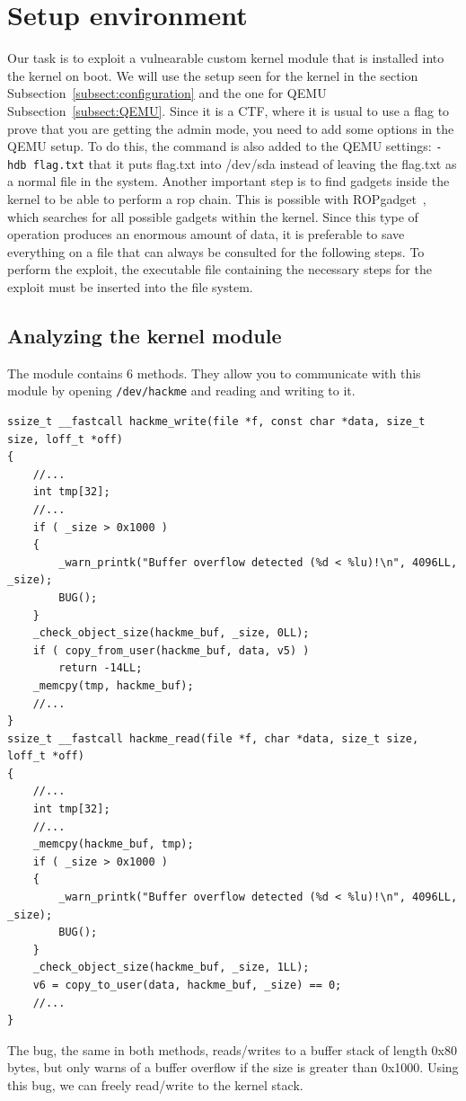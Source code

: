 \documentclass{masterthesis}
\newcommand{\refToSubSection}[1]{Subsection~\ref{subsect:#1}\xspace}
\begin{document}
\section{Setup environment}
Our task is to exploit a vulnearable custom kernel module that is installed into the kernel on boot.
We will use the setup seen for the kernel in the section \refToSubSection{configuration} and the one for QEMU \refToSubSection{QEMU}.
Since it is a CTF, where it is usual to use a flag to prove that you are getting the admin mode, you need to add some options in the QEMU setup.
To do this, the command is also added to the QEMU settings:
\lstinline{-hdb flag.txt}
that it puts flag.txt into /dev/sda instead of leaving the flag.txt as a normal file in the system.
Another important step is to find gadgets inside the kernel to be able to perform a rop chain.
This is possible with ROPgadget~\cite{rop_gadget}, which searches for all possible gadgets within the kernel.
Since this type of operation produces an enormous amount of data, it is preferable to save everything on a file that can always be consulted for the following steps.
To perform the exploit, the executable file containing the necessary steps for the exploit must be inserted into the file system.
\subsection{Analyzing the kernel module}
\label{subch:hackme}
The module contains 6 methods.
They allow you to communicate with this module by opening \lstinline{/dev/hackme} and reading and writing to it.
\begin{lstlisting}
ssize_t __fastcall hackme_write(file *f, const char *data, size_t size, loff_t *off)
{
    //...
    int tmp[32];
    //...
    if ( _size > 0x1000 )
    {
        _warn_printk("Buffer overflow detected (%d < %lu)!\n", 4096LL, _size);
        BUG();
    }
    _check_object_size(hackme_buf, _size, 0LL);
    if ( copy_from_user(hackme_buf, data, v5) )
        return -14LL;
    _memcpy(tmp, hackme_buf);
    //...
}
ssize_t __fastcall hackme_read(file *f, char *data, size_t size, loff_t *off)
{
    //...
    int tmp[32];
    //...
    _memcpy(hackme_buf, tmp);
    if ( _size > 0x1000 )
    {
        _warn_printk("Buffer overflow detected (%d < %lu)!\n", 4096LL, _size);
        BUG();
    }
    _check_object_size(hackme_buf, _size, 1LL);
    v6 = copy_to_user(data, hackme_buf, _size) == 0;
    //...
}
\end{lstlisting}
The bug, the same in both methods, reads/writes to a buffer stack of length 0x80 bytes, but only warns of a buffer overflow if the size is greater than 0x1000. Using this bug, we can freely read/write to the kernel stack.
\end{document}
